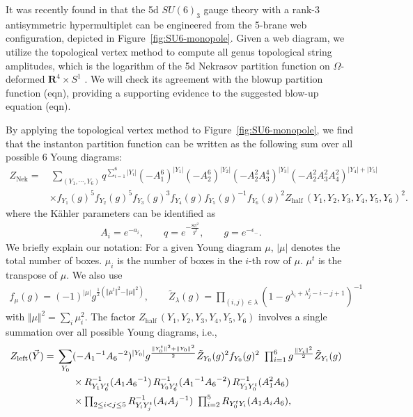 \documentclass[letterpaper, 11pt]{article}
\newcommand{\nn}{\nonumber}
\begin{document}
It was recently found in \cite{Hayashi:2019yxj} that the 5d $SU(6)_3$ gauge theory with a rank-3 antisymmetric hypermultiplet can be engineered from the 5-brane web configuration, depicted in Figure~\ref{fig:SU6-monopole}. Given a web diagram, we utilize  the topological vertex method \cite{Aganagic:2003db,Iqbal:2007ii} to compute all genus topological string amplitudes, which is the logarithm of the 5d Nekrasov partition function on $\Omega$-deformed $\mathbf{R}^4\times S^1$ \cite{Gopakumar:1998jq}. We will check its agreement with the blowup partition function (eqn), providing a supporting evidence to the suggested blow-up equation (eqn).

By applying the topological vertex method to Figure~\ref{fig:SU6-monopole}, we find that the instanton partition function can be  written as the following sum over all possible 6 Young diagrams:
\begin{align}
  \label{eq:znek-su6}
  Z_{\text{Nek}} 
  =&\, \sum_{(Y_1, \cdots, Y_6)}q^{\sum_{i=1}^6|Y_i|} (-A_1^6)^{|Y_1|}(-A_2^6)^{|Y_2|}(-A_2^2A_3^4)^{|Y_3|}(-A_2^2A_3^2A_4^2)^{|Y_4| + |Y_5|}\nn\\
  &\times f_{Y_1}(g)^5f_{Y_2}(g)^5f_{Y_3}(g)^3f_{Y_4}(g)f_{Y_5}(g)^{-1}f_{Y_6}(g)^{2}Z_{\text{half}}\,(Y_1, Y_2, Y_3, Y_4, Y_5, Y_6)^2. 
  \end{align}
  where the K\"ahler parameters can be identified as 
\begin{align}
A_i = e^{-a_i}, \qquad q = e^{-\frac{8\pi^2}{g^2}}, \qquad g=e^{-\epsilon_-}.
\end{align}
We briefly explain our notation: For a given Young diagram $\mu$, $|\mu|$ denotes the total number of boxes. $\mu_i$ is the number of boxes in the $i$-th row of $\mu$. $\mu^t$ is the transpose of $\mu$. We also use
\begin{align}
f_\mu(g) = (-1)^{|\mu|}g^{\frac{1}{2}({\Vert \mu^t\Vert ^2 - \Vert \mu\Vert ^2})}, \qquad \tilde{Z}_{\lambda}(g) 
= \prod_{(i,j) \in \lambda} {(1 - g^{\lambda_i + \lambda^t_j - i - j +1} )^{-1}}
\end{align}
with $\Vert \mu \Vert^2   = \sum_{i} \mu_i^2$. The factor $Z_{\text{half}}\,(Y_1, Y_2, Y_3, Y_4, Y_5, Y_6)$ involves a single summation over all possible Young diagrams, i.e.,
\begin{align}
Z_{\text{left}}(\vec{Y})= \,
\sum_{Y_0} &( - A_1{}^{-1} A_6{}^{-2})^{|Y_0|} 
g^{\frac{\Vert Y_0^t\Vert ^2+\Vert Y_0\Vert ^2}{2}} \tilde{Z}_{Y_0}(g)^2 f_{Y_0}(g)^2
\ \textstyle\prod_{i=1}^6 g^{\frac{\Vert Y_i\Vert ^2}{2}} \tilde{Z}_{Y_i} (g)
\cr 
& 
\times 
R_{Y_1 Y_6^t}^{-1} (A_1 A_6{}^{-1})\,R_{Y_0 Y_6^t}^{-1} (A_1{}^{-1} A_6{}^{-2})\,R_{Y_1Y_0^t }^{-1} (A_1^2A_6) \cr 
& 
\times  
 \textstyle\prod_{2 \le i <  j \le 5} R_{Y_i Y_j^t}^{-1} (A_i A_j{}^{-1})\ 
 \prod_{i=2}^5 R_{Y_0^t Y_i} (A_1 A_i  A_6) ,
\end{align}
\end{document}
